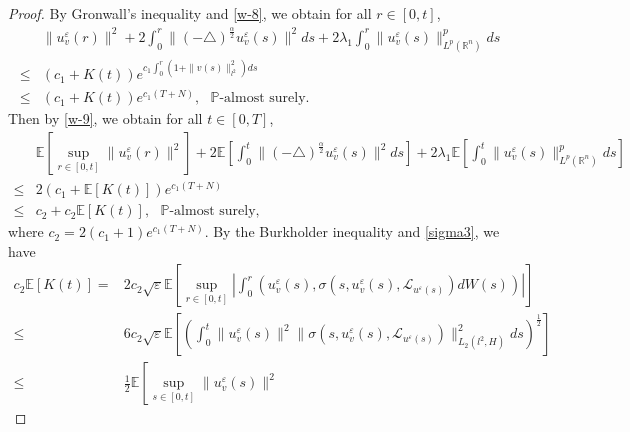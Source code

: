 \documentclass[11pt]{article}
\numberwithin{equation}{section}
\theoremstyle{plain}
\def\leq{\leqslant}
\begin{document}
\begin{proof}
    By Gronwall's inequality and \eqref{w-8}, we obtain for all $r \in [0,t]$,
    \begin{align}\label{w-9}
        & \|u_v^\varepsilon(r)\|^2
        + 2 \int_0^r \|(-\triangle)^{\frac{\alpha}{2}} u_v^\varepsilon (s) \|^2 ds
        + 2 \lambda_1 \int_{0}^{r} \| u_v^\varepsilon(s) \|_{L^p(\mathbb{R}^n)}^{p} ds
        \nonumber \\
        \leq & \left( c_1 + K(t) \right)
        e^{c_1 \int_0^r \left( 1 + \| v(s) \|_{l^2}^2 \right) ds}
        \nonumber \\
        \leq & \left( c_1 + K(t) \right) e^{c_1 (T + N)},  \ \ \    \mathbb{P} \text{-almost surely}.
    \end{align}
    Then by \eqref{w-9}, we obtain
    for all $t\in [0,T]$,
    \begin{align}\label{w-10}
        & \mathbb{E}
        \left[ \sup_{r \in [0,t]} \| u_v^\varepsilon(r) \|^2
        \right]
        + 2 \mathbb{E}
        \left[ \int_0^t \|(-\triangle)^{\frac{\alpha}{2}} u_v^\varepsilon (s) \|^2 ds
        \right]
        + 2 \lambda_1 \mathbb{E}
        \left[ \int_{0}^{t} \| u_v^\varepsilon(s) \|_{L^p(\mathbb{R}^n)}^{p} ds
        \right]
        \nonumber \\
        \leq & 2 \left( c_1
        + \mathbb{E} \left[ K(t) \right]
        \right) e^{c_1 (T + N)}  \nonumber \\
        \leq & c_2 + c_2 \mathbb{E} \left[ K(t) \right],
        \ \ \    \mathbb{P} \text{-almost surely},
    \end{align}
    where $c_2 = 2 \left( c_1 + 1 \right) e^{c_1 (T + N)}$.
    By the Burkholder inequality and \eqref{sigma3}, we have
    \begin{align}\label{w-11}
        c_2 \mathbb{E} \left[ K(t) \right]
        = & 2 c_2 \sqrt{\varepsilon}
        \mathbb{E}
        \left[ \sup_{r \in [0, t]}
        \left| \int_{0}^{r}
        \left( u_v^\varepsilon (s), \sigma(s, u_v^\varepsilon (s), \mathcal{L}_{u^\varepsilon(s)} ) dW(s)
        \right)
        \right|
        \right]  \nonumber \\
        \leq & 6 c_2 \sqrt{\varepsilon}
        \mathbb{E}\left[
        \left( \int_{0}^{t}
        \| u_v^\varepsilon(s) \|^2
        \| \sigma(s, u_v^\varepsilon (s), \mathcal{L}_{u^\varepsilon(s)} ) \|_{L_2(l^2, H)}^2
        ds
        \right)^{\frac{1}{2}}
        \right]
        \nonumber \\
        \leq & \frac{1}{2} \mathbb{E}
        \left[ \sup_{s \in [0,t]}
        \| u_v^\varepsilon(s) \|^2

\end{align}
\end{proof}
\end{document}
